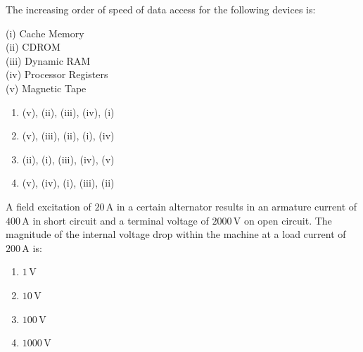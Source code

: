 \item The increasing order of speed of data access for the following devices is:

(i) Cache Memory \\
(ii) CDROM \\
(iii) Dynamic RAM \\
(iv) Processor Registers \\
(v) Magnetic Tape \\

\begin{enumerate}
\item (v), (ii), (iii), (iv), (i)
\item (v), (iii), (ii), (i), (iv)
\item (ii), (i), (iii), (iv), (v)
\item (v), (iv), (i), (iii), (ii)
\end{enumerate}

\item A field excitation of $20 \, \text{A}$ in a certain alternator results in an armature current of $400 \, \text{A}$ in short circuit and a terminal voltage of $2000 \, \text{V}$ on open circuit. The magnitude of the internal voltage drop within the machine at a load current of $200 \, \text{A}$ is:

\begin{enumerate}
\item $1 \, \text{V}$
\item $10 \, \text{V}$
\item $100 \, \text{V}$
\item $1000 \, \text{V}$
\end{enumerate}

